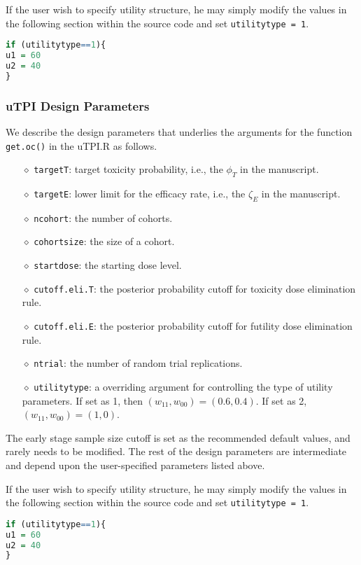 \documentclass[notitlepage]{article}
\begin{document}
 If the user wish to specify utility structure, he may simply modify the values in the following section within the source code and set \texttt{utilitytype = 1}.
\begin{lstlisting}[language=R]
if (utilitytype==1){
u1 = 60
u2 = 40
}
\end{lstlisting}

 \subsubsection{uTPI Design Parameters}
 We describe the design parameters that underlies the arguments for the function \texttt{get.oc()} in the uTPI.R as follows.
 \begin{itemize}
\item[$\diamond$] \texttt{targetT}: target toxicity probability, i.e., the $\phi_T$ in the manuscript.
\item[$\diamond$] \texttt{targetE}: lower limit for the efficacy rate, i.e., the $\zeta_E$ in the manuscript.
\item[$\diamond$] \texttt{ncohort}: the number of cohorts.
\item[$\diamond$] \texttt{cohortsize}: the size of a cohort.
\item[$\diamond$] \texttt{startdose}: the starting dose level.
\item[$\diamond$] \texttt{cutoff.eli.T}: the posterior probability cutoff for toxicity dose elimination rule.
\item[$\diamond$] \texttt{cutoff.eli.E}: the posterior probability cutoff for futility dose elimination rule.
\item[$\diamond$] \texttt{ntrial}: the number of random trial replications.
\item[$\diamond$] \texttt{utilitytype}: a overriding argument for controlling the type of utility parameters. If set as 1, then $(w_{11},w_{00}) = (0.6,0.4)$. If set as 2, $(w_{11},w_{00}) = (1,0)$.
\end{itemize}
 The early stage sample size cutoff is set as the recommended default values, and rarely needs to be modified. The rest of the design parameters are intermediate and depend upon the user-specified parameters listed above.

If the user wish to specify utility structure, he may simply modify the values in the following section within the source code and set \texttt{utilitytype = 1}.
\begin{lstlisting}[language=R]
if (utilitytype==1){
u1 = 60
u2 = 40
}
\end{lstlisting}
\end{document}
